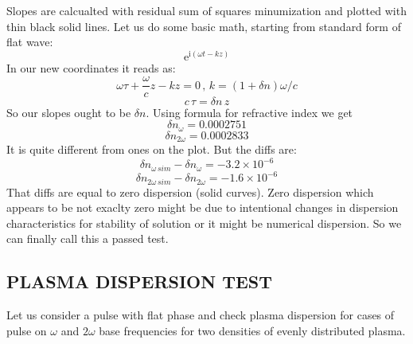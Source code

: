 \documentclass{article}
\newcommand{\ff}{\frac}
\begin{document}
Slopes are calcualted with residual sum of squares minumization and plotted with thin black solid lines. 
Let us do some basic math, starting from standard form of flat wave:
\[ \mathrm{e}^{\mathrm{i}(\omega t - k z)} \]
In our new coordinates it reads as:
\[ \omega \tau + \ff{\omega}{c} z - k z = 0 \, , \, k = (1+\delta n) \omega / c \]
\[ c \, \tau = \delta n \, z \]
So our slopes ought to be $\delta n$. Using formula for refractive index we get
\[ \delta n_\omega = 0.0002751 \]
\[ \delta n_{2\omega} = 0.0002833 \]
It is quite different from ones on the plot. But the diffs are:
\[ \delta n_{\omega \, sim} - \delta n_\omega = -3.2\times10^{-6} \]
\[ \delta n_{2\omega \, sim} - \delta n_{2\omega} = -1.6\times10^{-6} \]
That diffs are equal to zero dispersion (solid curves). Zero dispersion which appears to be not exaclty zero might be due to intentional changes in dispersion characteristics for stability of solution or it might be numerical dispersion. So we can finally call this a passed test. 

\newpage
\subsection{PLASMA DISPERSION TEST}
Let us consider a pulse with flat phase and check plasma dispersion for cases of pulse on $\omega$ and $2\omega$ base frequencies for two densities of evenly distributed plasma.
\end{document}
